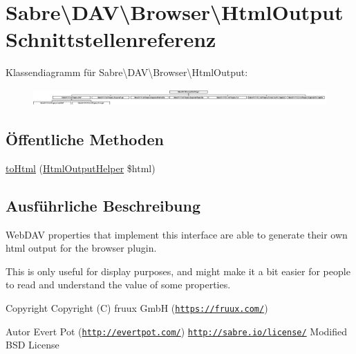 \hypertarget{interface_sabre_1_1_d_a_v_1_1_browser_1_1_html_output}{}\section{Sabre\textbackslash{}D\+AV\textbackslash{}Browser\textbackslash{}Html\+Output Schnittstellenreferenz}
\label{interface_sabre_1_1_d_a_v_1_1_browser_1_1_html_output}
Klassendiagramm für Sabre\textbackslash{}D\+AV\textbackslash{}Browser\textbackslash{}Html\+Output\+:\begin{figure}[H]
\begin{center}
\leavevmode
\includegraphics[height=0.638298cm]{interface_sabre_1_1_d_a_v_1_1_browser_1_1_html_output}
\end{center}
\end{figure}
\subsection*{Öffentliche Methoden}
\begin{DoxyCompactItemize}
\item 
\mbox{\hyperlink{interface_sabre_1_1_d_a_v_1_1_browser_1_1_html_output_a53a24f82474cef8c1fcf00e87de3bf7c}{to\+Html}} (\mbox{\hyperlink{class_sabre_1_1_d_a_v_1_1_browser_1_1_html_output_helper}{Html\+Output\+Helper}} \$html)
\end{DoxyCompactItemize}


\subsection{Ausführliche Beschreibung}
Web\+D\+AV properties that implement this interface are able to generate their own html output for the browser plugin.

This is only useful for display purposes, and might make it a bit easier for people to read and understand the value of some properties.

\begin{DoxyCopyright}{Copyright}
Copyright (C) fruux GmbH (\href{https://fruux.com/}{\tt https\+://fruux.\+com/}) 
\end{DoxyCopyright}
\begin{DoxyAuthor}{Autor}
Evert Pot (\href{http://evertpot.com/}{\tt http\+://evertpot.\+com/})  \href{http://sabre.io/license/}{\tt http\+://sabre.\+io/license/} Modified B\+SD License 
\end{DoxyAuthor}



